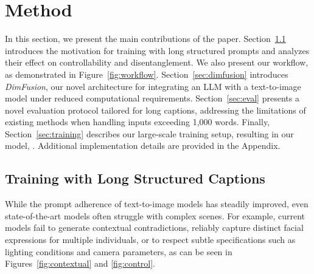 
 



\section{Method}
\label{sec:method}

In this section, we present the main contributions of the paper. Section~\ref{sec:captions} introduces the motivation for training with long structured prompts and analyzes their effect on controllability and disentanglement. We also present our workflow, as demonstrated in Figure~\ref{fig:workflow}.
Section~\ref{sec:dimfusion} introduces \emph{DimFusion}, our novel architecture for integrating an LLM with a text-to-image model under reduced computational requirements. 
Section~\ref{sec:eval} presents a novel evaluation protocol tailored for long captions, addressing the limitations of existing methods when handling inputs exceeding 1{,}000 words. Finally, Section~\ref{sec:training} describes our large-scale training setup, resulting in our model, \textit{\modelname{}}. Additional implementation details are provided in the Appendix.  







\subsection{Training with Long Structured Captions}
\label{sec:captions}

While the prompt adherence of text-to-image models has steadily improved, even state-of-the-art models often struggle with complex scenes. For example, current models fail to generate contextual contradictions, reliably capture distinct facial expressions for multiple individuals, or to respect subtle specifications such as lighting conditions and camera parameters, as can be seen in Figures~\ref{fig:contextual} and \ref{fig:control}.



